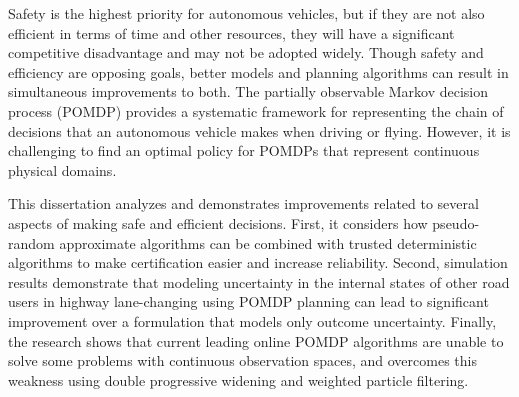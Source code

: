 \documentclass[11pt, letterpaper, oneside, extrafontsizes]{memoir}
\begin{document}
Safety is the highest priority for autonomous vehicles, but if they are not also efficient in terms of time and other resources, they will have a significant competitive disadvantage and may not be adopted widely.
Though safety and efficiency are opposing goals, better models and planning algorithms can result in simultaneous improvements to both.
The partially observable Markov decision process (POMDP) provides a systematic framework for representing the chain of decisions that an autonomous vehicle makes when driving or flying.
However, it is challenging to find an optimal policy for POMDPs that represent continuous physical domains.

This dissertation analyzes and demonstrates improvements related to several aspects of making safe and efficient decisions.
First, it considers how pseudo-random approximate algorithms can be combined with trusted deterministic algorithms to make certification easier and increase reliability.
Second, simulation results demonstrate that modeling uncertainty in the internal states of other road users in highway lane-changing using POMDP planning can lead to significant improvement over a formulation that models only outcome uncertainty.
Finally, the research shows that current leading online POMDP algorithms are unable to solve some problems with continuous observation spaces, and overcomes this weakness using double progressive widening and weighted particle filtering.

\end{document}

